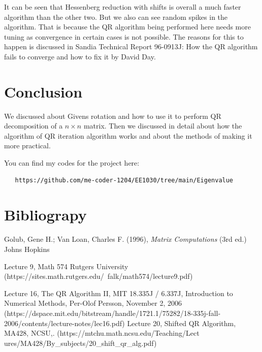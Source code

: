 \documentclass[journal]{IEEEtran}
\numberwithin{equation}{section}
\begin{document}
It can be seen that Hessenberg reduction with shifts is overall a much faster algorithm than the other two. But we also can see random spikes in the algorithm. 
That is because the QR algorithm being performed here needs more tuning as convergence in certain cases is not possible.
The reasons for this to happen is discussed in Sandia Technical Report 96-0913J: How the QR algorithm fails to converge and how to fix it by David Day.

\section{Conclusion}

We discussed about Givens rotation and how to use it to perform QR decomposition of a $n \times n$ matrix. Then we discussed in detail about how the algorithm of QR iteration algorithm works and about the methods of making it more practical. 

You can find my codes for the project here:
\begin{lstlisting}
   https://github.com/me-coder-1204/EE1030/tree/main/Eigenvalue 
\end{lstlisting}

\section{Bibliograpy}

\begin{thebibliography}{9}
    Golub, Gene H.; Van Loan, Charles F. (1996), \textit{Matrix Computations} (3rd ed.) Johns Hopkins 

    Lecture 9, Math 574 Rutgers University (https://sites.math.rutgers.edu/~falk/math574/lecture9.pdf)

    Lecture 16, The QR Algorithm II, MIT 18.335J / 6.337J, Introduction to Numerical Methods, Per-Olof Persson, November 2, 2006 (https://dspace.mit.edu/bitstream/handle/1721.1/75282/18-335j-fall-2006/contents/lecture-notes/lec16.pdf)
    Lecture 20, Shifted QR Algorithm, MA428, NCSU,. (https://mtchu.math.ncsu.edu/Teaching/Lect\\ures/MA428/By\_subjects/20\_shift\_qr\_alg.pdf)
\end{thebibliography}
\end{document}
